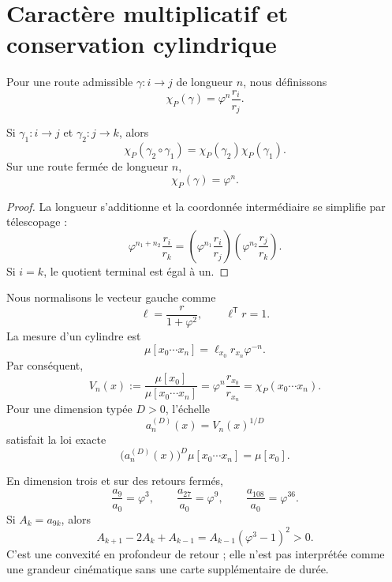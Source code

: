\section{Caractère multiplicatif et conservation cylindrique}

Pour une route admissible \(\gamma:i\to j\) de longueur \(n\), nous définissons
\begin{equation}
 \chi_P(\gamma)=\varphi^n\frac{r_i}{r_j}.
 \label{gfp:b:eq:caracter-parry-phi}
\end{equation}

\begin{proposition}
\label{gfp:b:prop:multiplicatividad-parry-phi}
Si \(\gamma_1:i\to j\) et \(\gamma_2:j\to k\), alors
\[
 \chi_P(\gamma_2\circ\gamma_1)
 =\chi_P(\gamma_2)\chi_P(\gamma_1).
\]
Sur une route fermée de longueur \(n\),
\[
 \chi_P(\gamma)=\varphi^n.
\]
\end{proposition}

\begin{proof}
La longueur s’additionne et la coordonnée intermédiaire se simplifie par télescopage :
\[
 \varphi^{n_1+n_2}\frac{r_i}{r_k}
 =\left(\varphi^{n_1}\frac{r_i}{r_j}\right)
  \left(\varphi^{n_2}\frac{r_j}{r_k}\right).
\]
Si \(i=k\), le quotient terminal est égal à un.
\end{proof}

Nous normalisons le vecteur gauche comme
\[
 \ell=\frac{r}{1+\varphi^2},
 \qquad
 \ell^{\mathsf T}r=1.
\]
La mesure d’un cylindre est
\[
 \mu[x_0\cdots x_n]
 =\ell_{x_0}r_{x_n}\varphi^{-n}.
\]
Par conséquent,
\begin{equation}
 V_n(x)
 :=\frac{\mu[x_0]}{\mu[x_0\cdots x_n]}
 =\varphi^n\frac{r_{x_0}}{r_{x_n}}
 =\chi_P(x_0\cdots x_n).
 \label{gfp:b:eq:volumen-cilindrico-phi}
\end{equation}
Pour une dimension typée \(D>0\), l’échelle
\[
 a_n^{(D)}(x)=V_n(x)^{1/D}
\]
satisfait la loi exacte
\begin{equation}
 \boxed{
 \bigl(a_n^{(D)}(x)\bigr)^D
 \mu[x_0\cdots x_n]=\mu[x_0].}
 \label{gfp:b:eq:conservacion-cilindrica-phi}
\end{equation}

En dimension trois et sur des retours fermés,
\[
 \frac{a_9}{a_0}=\varphi^3,
 \qquad
 \frac{a_{27}}{a_0}=\varphi^9,
 \qquad
 \frac{a_{108}}{a_0}=\varphi^{36}.
\]
Si \(A_k=a_{9k}\), alors
\begin{equation}
 A_{k+1}-2A_k+A_{k-1}
 =A_{k-1}(\varphi^3-1)^2>0.
 \label{gfp:b:eq:convexidad-retornos-phi}
\end{equation}
C’est une convexité en profondeur de retour ; elle n’est pas interprétée comme une
grandeur cinématique sans une carte supplémentaire de durée.

